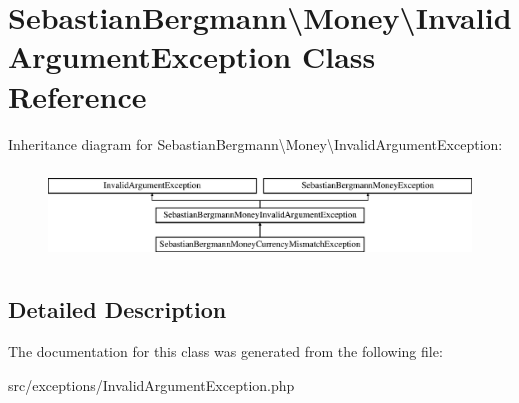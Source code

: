 \hypertarget{classSebastianBergmann_1_1Money_1_1InvalidArgumentException}{}\section{Sebastian\+Bergmann\textbackslash{}Money\textbackslash{}Invalid\+Argument\+Exception Class Reference}
\label{classSebastianBergmann_1_1Money_1_1InvalidArgumentException}
Inheritance diagram for Sebastian\+Bergmann\textbackslash{}Money\textbackslash{}Invalid\+Argument\+Exception\+:\begin{figure}[H]
\begin{center}
\leavevmode
\includegraphics[height=2.463343cm]{classSebastianBergmann_1_1Money_1_1InvalidArgumentException}
\end{center}
\end{figure}


\subsection{Detailed Description}


The documentation for this class was generated from the following file\+:\begin{DoxyCompactItemize}
\item 
src/exceptions/Invalid\+Argument\+Exception.\+php\end{DoxyCompactItemize}

